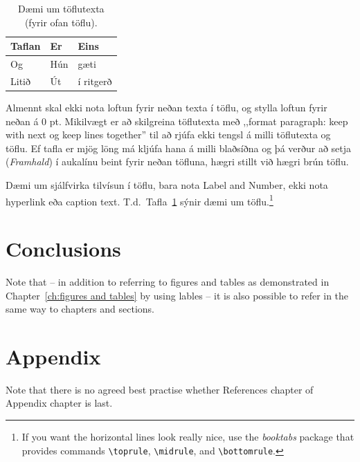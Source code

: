 \documentclass[a4paper,12pt,twoside,BCOR=10mm]{scrbook}
\begin{document}
\begin{table}[htb]
  \centering
  \caption{Dæmi um töflutexta (fyrir ofan töflu).}
  \sffamily
  \begin{tabularx}{0.9\textwidth}{ p{4.0cm}  p{4.0cm}  p{4.0cm} }
    \hline
   \textbf{Taflan} \hfill & \textbf{Er} \hfill & \textbf{Eins} \\ \hline
    Og & Hún & gæti\\
    Litið & Út & í ritgerð\\ \hline
  \end{tabularx} \normalfont
  \label{table:Emissivity}
\end{table}

Almennt skal ekki nota loftun fyrir neðan texta í töflu, og stylla loftun fyrir neðan á 0 pt.
Mikilvægt er að skilgreina töflutexta með ,,format paragraph: keep with next og keep lines together” til að rjúfa ekki tengsl á milli töflutexta og töflu. Ef tafla er mjög löng má kljúfa hana á milli blaðsíðna og þá verður að setja (\textit{Framhald}) í aukalínu beint fyrir neðan töfluna, hægri stillt við hægri brún töflu.

Dæmi um sjálfvirka tilvísun í töflu, bara nota Label and Number, ekki nota hyperlink eða caption text. T.d.\ Tafla~\ref{table:Emissivity} sýnir dæmi um töflu.\footnote{If you want the horizontal lines look really nice, use the \emph{booktabs} package that provides commands \texttt{\textbackslash{}toprule}, \texttt{\textbackslash{}midrule}, and \texttt{\textbackslash{}bottomrule}.}

\chapter{Conclusions}

Note that -- in addition to referring to figures and tables as
demonstrated in Chapter~\ref{ch:figures and tables} by using
lables -- it is also possible to refer in the same way to chapters and sections.

\printbibliography[ heading=bibintoc, title={References} ]

\appendix
\renewcommand{\chaptername}{Appendix}
\chapter{Appendix}

Note that there is no agreed best practise whether References chapter of Appendix chapter is last.
\end{document}
